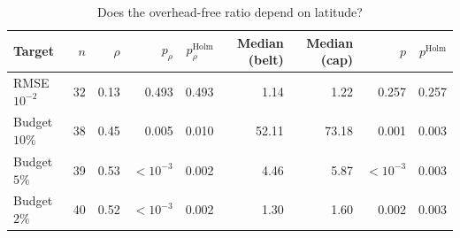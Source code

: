 \begin{table}[t]
\centering
\caption{Does the overhead-free ratio depend on latitude?}
\label{tab:latitude_effect}
\footnotesize
\begin{tabular}{lrrrrrrrr}
\toprule
Target & $n$ & $\rho$ & $p_\rho$ & $p_\rho^{\mathrm{Holm}}$ & Median (belt) & Median (cap) & $p$ & $p^{\mathrm{Holm}}$ \\
\midrule
RMSE $10^{-2}$ & 32 & 0.13 & 0.493 & 0.493 & 1.14 & 1.22 & 0.257 & 0.257 \\
Budget $10\%$ & 38 & 0.45 & 0.005 & 0.010 & 52.11 & 73.18 & 0.001 & 0.003 \\
Budget $5\%$ & 39 & 0.53 & $<10^{-3}$ & 0.002 & 4.46 & 5.87 & $<10^{-3}$ & 0.003 \\
Budget $2\%$ & 40 & 0.52 & $<10^{-3}$ & 0.002 & 1.30 & 1.60 & 0.002 & 0.003 \\
\bottomrule
\end{tabular}
\end{table}
